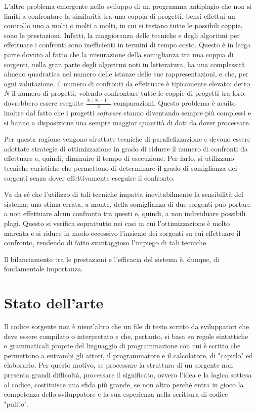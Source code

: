 L'altro problema emergente nello sviluppo di un programma antiplagio che non si limiti a confrontare la similarità tra una coppia di progetti, bensì effettui un controllo uno a molti o molti a molti, in cui si testano tutte le possibili coppie, sono le prestazioni. 
%
Infatti, la maggioranza delle tecniche e degli algoritmi per effettuare i confronti sono inefficienti in termini di tempo costo. 
%
Questo è in larga parte dovuto al fatto che la misurazione della somiglianza tra una coppia di sorgenti, nella gran parte degli algoritmi noti in letteratura, ha una complessità almeno quadratica nel numero delle istanze delle sue rappresentazioni, e che, per ogni valutazione, il numero di confronti da effettuare è tipicamente elevato: detto $N$ il numero di progetti, volendo confrontare tutte le coppie di progetti tra loro, dovrebbero essere eseguite $\frac{N(N-1)}{2}$ comparazioni.
%
Questo problema è acuito inoltre dal fatto che i progetti \textit{software} stanno diventando sempre più complessi e si hanno a disposizione una sempre maggior quantità di dati da dover processare.

Per questa ragione vengono sfruttate tecniche di parallelizzazione e devono essere adottate strategie di ottimizzazione in grado di ridurre il numero di confronti da effettuare e, quindi, diminuire il tempo di esecuzione.
%
Per farlo, si utilizzano tecniche euristiche che permettono di determinare il grado di somiglianza dei sorgenti senza dover effettivamente eseguire il confronto.

Va da sé che l'utilizzo di tali tecniche impatta inevitabilmente la sensibilità del sistema: una stima errata, a monte, della somiglianza di due sorgenti può portare a non effettuare alcun confronto tra questi e, quindi, a non individuare possibili plagi. 
%
Questo si verifica soprattutto nei casi in cui l'ottimizzazione è molto marcata e si riduce in modo eccessivo l'insieme dei sorgenti su cui effettuare il confronto, rendendo di fatto svantaggioso l'impiego di tali tecniche.

Il bilanciamento tra le prestazioni e l'efficacia del sistema è, dunque, di fondamentale importanza.

\section{Stato dell'arte}
Il codice sorgente non è nient'altro che un file di testo scritto da sviluppatori che deve essere compilato o interpretato e che, pertanto, si basa su regole sintattiche e grammaticali proprie del linguaggio di programmazione con cui è scritto che permettono a entrambi gli attori, il programmatore e il calcolatore, di "capirlo" ed elaborarlo.
%
Per questo motivo, se processare la struttura di un sorgente non presenta grandi difficoltà, processare il significato, ovvero l'idea e la logica sottesa al codice, costituisce una sfida più grande, se non altro perché entra in gioco la competenza dello sviluppatore e la sua esperienza nella scrittura di codice "pulito".

